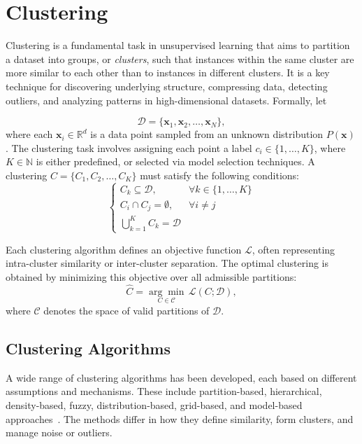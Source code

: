 \section{Clustering}\label{sec:clustering}

Clustering is a fundamental task in unsupervised learning that aims to
partition a dataset into groups, or \textit{clusters}, such that instances
within the same cluster are more similar to each other than to instances in
different clusters. It is a key technique for discovering underlying structure,
compressing data, detecting outliers, and analyzing patterns in
high-dimensional datasets. Formally, let

\begin{equation}
    \mathcal{D} = \{\mathbf{x}_1, \mathbf{x}_2, \ldots, \mathbf{x}_N\},
\end{equation}
where each $\mathbf{x}_i \in \mathbb{R}^d$ is a data point sampled from an unknown distribution
$P(\mathbf{x})$. The clustering task involves assigning each point a label $c_i
    \in \{1, \ldots, K\}$, where $K \in \mathbb{N}$ is either predefined,
or selected via model selection techniques.
A clustering $C = \{C_1, C_2, \ldots, C_K\}$
must satisfy the following conditions:
\begin{equation}
    \begin{cases}
        C_k \subseteq \mathcal{D}, & \forall k \in \{1, \ldots, K\} \\
        C_i \cap C_j = \emptyset,  & \forall i \neq j               \\
        \bigcup_{k=1}^{K} C_k = \mathcal{D}
    \end{cases}
\end{equation}

Each clustering algorithm defines an objective function $\mathcal{L}$, often
representing intra-cluster similarity or inter-cluster separation. The optimal
clustering is obtained by minimizing this objective over all admissible
partitions:
\begin{equation}
    \hat{C} = \underset{C \in \mathcal{C}}{\arg\min} \, \mathcal{L}(C; \mathcal{D}),
\end{equation}
where $\mathcal{C}$ denotes the space of valid partitions of $\mathcal{D}$.

\subsection{Clustering Algorithms}
A wide range of clustering algorithms has been developed, each based on
different assumptions and mechanisms. These include partition-based,
hierarchical, density-based, fuzzy, distribution-based, grid-based, and
model-based approaches~\cite{clustering_survey}. The methods differ in how they
define similarity, form clusters, and manage noise or outliers.

